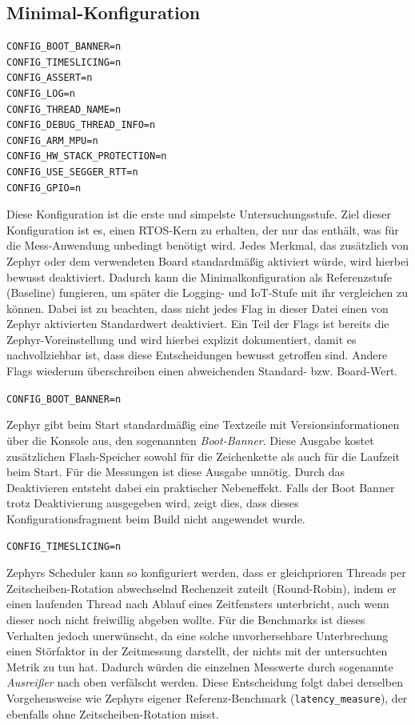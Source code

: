 \subsection{Minimal-Konfiguration}
\begin{lstlisting}[style=basecode,language=Kconfig]
CONFIG_BOOT_BANNER=n
CONFIG_TIMESLICING=n
CONFIG_ASSERT=n
CONFIG_LOG=n
CONFIG_THREAD_NAME=n
CONFIG_DEBUG_THREAD_INFO=n
CONFIG_ARM_MPU=n
CONFIG_HW_STACK_PROTECTION=n
CONFIG_USE_SEGGER_RTT=n
CONFIG_GPIO=n
\end{lstlisting}
Diese Konfiguration ist die erste und simpelste Untersuchungsstufe. Ziel dieser Konfiguration ist es, einen RTOS-Kern zu erhalten, der nur das enth{\"a}lt, was f{\"u}r die Mess-Anwendung unbedingt ben{\"o}tigt wird. Jedes Merkmal, das zus{\"a}tzlich von Zephyr oder dem verwendeten Board standardm{\"a}{\ss}ig aktiviert w{\"u}rde, wird hierbei bewusst deaktiviert. Dadurch kann die Minimalkonfiguration als Referenzstufe (Baseline) fungieren, um sp{\"a}ter die Logging- und IoT-Stufe mit ihr vergleichen zu k{\"o}nnen. Dabei ist zu beachten, dass nicht jedes Flag in dieser Datei einen von Zephyr aktivierten Standardwert deaktiviert. Ein Teil der Flags ist bereits die Zephyr-Voreinstellung und wird hierbei explizit dokumentiert, damit es nachvollziehbar ist, dass diese Entscheidungen bewusst getroffen sind. Andere Flags wiederum {\"u}berschreiben einen abweichenden Standard- bzw. Board-Wert.

\lstinline[style=codeinline]|CONFIG_BOOT_BANNER=n|

Zephyr gibt beim Start standardm{\"a}{\ss}ig eine Textzeile mit Versionsinformationen {\"u}ber die Konsole aus, den sogenannten \emph{Boot-Banner}. Diese Ausgabe kostet zus{\"a}tzlichen Flash-Speicher sowohl f{\"u}r die Zeichenkette als auch f{\"u}r die Laufzeit beim Start. F{\"u}r die Messungen ist diese Ausgabe unn{\"o}tig. Durch das Deaktivieren entsteht dabei ein praktischer Nebeneffekt. Falls der Boot Banner trotz Deaktivierung ausgegeben wird, zeigt dies, dass dieses Konfigurationsfragment beim Build nicht angewendet wurde.

\lstinline[style=codeinline]|CONFIG_TIMESLICING=n|

Zephyrs Scheduler kann so konfiguriert werden, dass er gleichprioren Threads per Zeitscheiben-Rotation abwechselnd Rechenzeit zuteilt (Round-Robin), indem er einen laufenden Thread nach Ablauf eines Zeitfensters unterbricht, auch wenn dieser noch nicht freiwillig abgeben wollte. F{\"u}r die Benchmarks ist dieses Verhalten jedoch unerw{\"u}nscht, da eine solche unvorhersehbare Unterbrechung einen St{\"o}rfaktor in der Zeitmessung darstellt, der nichts mit der untersuchten Metrik zu tun hat. Dadurch w{\"u}rden die einzelnen Messwerte durch sogenannte\emph{ Ausrei{\ss}er} nach oben verf{\"a}lscht werden. Diese Entscheidung folgt dabei derselben Vorgehensweise wie Zephyrs eigener Referenz-Benchmark (\lstinline[style=codeinline]|latency_measure|), der ebenfalls ohne Zeitscheiben-Rotation misst.

